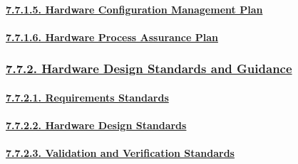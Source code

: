 \documentclass[
]{article}
\begin{document}
\hypertarget{hardware-configuration-management-plan}{%
\paragraph{\texorpdfstring{\protect\hyperlink{hardware-configuration-management-plan-1}{7.7.1.5.
Hardware Configuration Management
Plan}}{7.7.1.5. Hardware Configuration Management Plan}}\label{hardware-configuration-management-plan}}

\hypertarget{hardware-process-assurance-plan}{%
\paragraph{\texorpdfstring{\protect\hyperlink{hardware-process-assurance-plan-1}{7.7.1.6.
Hardware Process Assurance
Plan}}{7.7.1.6. Hardware Process Assurance Plan}}\label{hardware-process-assurance-plan}}

\hypertarget{hardware-design-standards-and-guidance}{%
\subsubsection{\texorpdfstring{\protect\hyperlink{hardware-design-standards-and-guidance-1}{7.7.2.
Hardware Design Standards and
Guidance}}{7.7.2. Hardware Design Standards and Guidance}}\label{hardware-design-standards-and-guidance}}

\hypertarget{requirements-standards}{%
\paragraph{\texorpdfstring{\protect\hyperlink{requirements-standards-1}{7.7.2.1.
Requirements
Standards}}{7.7.2.1. Requirements Standards}}\label{requirements-standards}}

\hypertarget{hardware-design-standards}{%
\paragraph{\texorpdfstring{\protect\hyperlink{hardware-design-standards-1}{7.7.2.2.
Hardware Design
Standards}}{7.7.2.2. Hardware Design Standards}}\label{hardware-design-standards}}

\hypertarget{validation-and-verification-standards}{%
\paragraph{\texorpdfstring{\protect\hyperlink{validation-and-verification-standards-1}{7.7.2.3.
Validation and Verification
Standards}}{7.7.2.3. Validation and Verification Standards}}\label{validation-and-verification-standards}}
\end{document}

